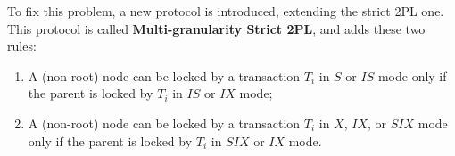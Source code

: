 To fix this problem, a new protocol is introduced, extending the strict 2PL one. This protocol is called \textbf{Multi-granularity Strict 2PL}, and adds these two rules:
\begin{enumerate}
    \item A (non-root) node can be locked by a transaction $T_i$ in $S$ or $IS$ mode only if the parent is locked by $T_i$ in $IS$ or $IX$ mode;

    \item A (non-root) node can be locked by a transaction $T_i$ in $X$, $IX$, or $SIX$ mode only if the parent is locked by $T_i$ in $SIX$ or $IX$ mode. 
\end{enumerate}
